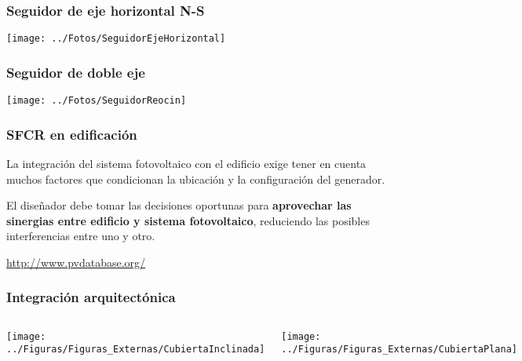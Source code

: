 \documentclass[serif, xcolor=dvipsnames]{beamer}
\begin{document}
\begin{frame}[plain]
  \frametitle{Seguidor de eje horizontal N-S}

  \begin{center}
    \texttt{[image: ../Fotos/SeguidorEjeHorizontal]}
    \par\end{center}


\end{frame}
\begin{frame}[plain]
  \frametitle{Seguidor de doble eje}

  \begin{center}
    \texttt{[image: ../Fotos/SeguidorReocin]}
    \par\end{center}


\end{frame}
\begin{frame}
  \frametitle{SFCR en edificación}
  \begin{block} {}

    La integración del sistema fotovoltaico con el edificio exige
    tener en cuenta muchos factores que condicionan la ubicación y la
    configuración del generador.

    El diseñador debe tomar las decisiones oportunas para
    \textbf{aprovechar las sinergias entre edificio y sistema
      fotovoltaico}, reduciendo las posibles interferencias entre uno
    y otro.

  \end{block}
  \begin{center}
    \url{http://www.pvdatabase.org/}
    \par\end{center}


\end{frame}
\begin{frame}
  \frametitle{Integración arquitectónica}
  \begin{columns}[c]%


    \column{6cm}

    \texttt{[image: ../Figuras/Figuras\_Externas/CubiertaInclinada]}


    \column{4cm}

    \texttt{[image: ../Figuras/Figuras\_Externas/CubiertaPlana]}

  \end{columns}%

\end{frame}
\end{document}
